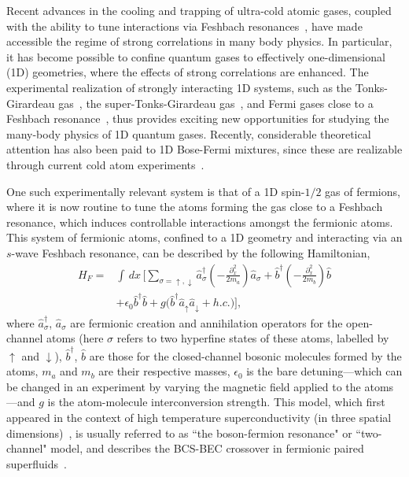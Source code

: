 \documentclass[aps,pra,
superscriptaddress,
reprint,twocolumn,preprintnumbers,
amsmath,amssymb,
nofootinbib]{revtex4-1}
\begin{document}
Recent advances in the cooling and trapping of ultra-cold atomic gases, coupled with the ability to tune interactions via Feshbach resonances~\cite{Regal2003,Inouye2004,Stan2004,Gunter2006,Best2009}, have made accessible the regime of strong correlations in many body physics. In particular, it has become possible to confine quantum gases to effectively one-dimensional (1D) geometries, where the effects of strong correlations are enhanced. The experimental realization of strongly interacting 1D systems, such as the Tonks-Girardeau gas~\cite{Paredes2004,Kinoshita2004}, the super-Tonks-Girardeau gas~\cite{Haller2009}, and Fermi gases close to a Feshbach resonance~\cite{Gunter2005,Esslinger2005,Liao2010}, thus provides exciting new opportunities for studying the many-body physics of 1D quantum gases. Recently, considerable theoretical attention has also been paid to 1D Bose-Fermi mixtures, since these are realizable through current cold atom experiments~\cite{Das2003,Yin2012,Batchelor2005,Guan2008,Demler2006a,*Demler2006b,Mathey2004,Cazalilla2003,Giorgini2002,Gritsev2010}.

One such experimentally relevant system is that of a 1D spin-$1/2$ gas of fermions, where it is now routine to tune the atoms forming the gas close to a Feshbach resonance, which induces controllable interactions amongst the fermionic atoms. This system of fermionic atoms, confined to a 1D geometry and interacting via an $s$-wave Feshbach resonance, can be described by the following Hamiltonian,
	\begin{align}
	\label{eqn:01}
	H_F = & \int \, dx \, \Bigg[ \sum\limits_{\sigma=\uparrow,\downarrow} \hat{a}_{\sigma}^{\dagger} \left(-\frac{\partial^2_x}{2 m_a}\right) \hat{a}_{\sigma} + \hat{b}^{\dagger}\left( -\frac{\partial^2_x}{2 m_b}  \right)  \hat{b} \nonumber \\ & + \epsilon_0 \hat{b}^{\dagger} \hat{b} +  g \big(\hat{b}^\dagger \hat{a}_\uparrow \hat{a}_{\downarrow} + h.c. \big) \Bigg],
	\end{align}
where $\hat{a}_{\sigma}^\dagger$, $\hat{a}_{\sigma}$ are fermionic creation and annihilation operators for the open-channel atoms (here $\sigma$ refers to
two hyperfine states of these atoms, labelled by $\uparrow$ and $\downarrow$), $\hat{b}^\dagger$, $\hat{b}$ are those for the closed-channel bosonic molecules
formed by the atoms, $m_a$ and $m_b$ are their respective masses, $\epsilon_0$ is the bare detuning---which can be changed in an experiment by varying the
magnetic field applied to the atoms---and $g$ is the atom-molecule interconversion strength. 
This model, which first appeared in the context of high temperature superconductivity (in three spatial dimensions)~\cite{Lee1989a, *Lee1989b}, is usually referred to as ``the boson-fermion resonance" or ``two-channel" model, and describes the BCS-BEC crossover in fermionic paired superfluids~\cite{Holland2001,Timmermans2001,Gurarie2007,Recati2005}. 
\end{document}
